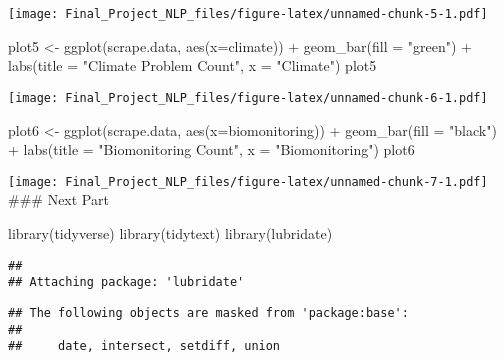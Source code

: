 \documentclass[
]{article}
\newenvironment{Shaded}{\begin{snugshade}}{\end{snugshade}}
\newcommand{\AttributeTok}[1]{\textcolor[rgb]{0.77,0.63,0.00}{#1}}
\newcommand{\FunctionTok}[1]{\textcolor[rgb]{0.00,0.00,0.00}{#1}}
\newcommand{\NormalTok}[1]{#1}
\newcommand{\OtherTok}[1]{\textcolor[rgb]{0.56,0.35,0.01}{#1}}
\newcommand{\SpecialCharTok}[1]{\textcolor[rgb]{0.00,0.00,0.00}{#1}}
\newcommand{\StringTok}[1]{\textcolor[rgb]{0.31,0.60,0.02}{#1}}
\begin{document}
\texttt{[image: Final\_Project\_NLP\_files/figure-latex/unnamed-chunk-5-1.pdf]}

\begin{Shaded}
\begin{Highlighting}[]
\NormalTok{plot5 }\OtherTok{\textless{}{-}} \FunctionTok{ggplot}\NormalTok{(scrape.data, }\FunctionTok{aes}\NormalTok{(}\AttributeTok{x=}\NormalTok{climate)) }\SpecialCharTok{+} \FunctionTok{geom\_bar}\NormalTok{(}\AttributeTok{fill =} \StringTok{"green"}\NormalTok{) }\SpecialCharTok{+}
  \FunctionTok{labs}\NormalTok{(}\AttributeTok{title =} \StringTok{"Climate Problem Count"}\NormalTok{, }\AttributeTok{x =} \StringTok{"Climate"}\NormalTok{)}
\NormalTok{plot5}
\end{Highlighting}
\end{Shaded}

\texttt{[image: Final\_Project\_NLP\_files/figure-latex/unnamed-chunk-6-1.pdf]}

\begin{Shaded}
\begin{Highlighting}[]
\NormalTok{plot6 }\OtherTok{\textless{}{-}} \FunctionTok{ggplot}\NormalTok{(scrape.data, }\FunctionTok{aes}\NormalTok{(}\AttributeTok{x=}\NormalTok{biomonitoring)) }\SpecialCharTok{+} \FunctionTok{geom\_bar}\NormalTok{(}\AttributeTok{fill =} \StringTok{"black"}\NormalTok{) }\SpecialCharTok{+}
  \FunctionTok{labs}\NormalTok{(}\AttributeTok{title =} \StringTok{"Biomonitoring Count"}\NormalTok{, }\AttributeTok{x =} \StringTok{"Biomonitoring"}\NormalTok{)}
\NormalTok{plot6}
\end{Highlighting}
\end{Shaded}

\texttt{[image: Final\_Project\_NLP\_files/figure-latex/unnamed-chunk-7-1.pdf]}
\#\#\# Next Part

\begin{Shaded}
\begin{Highlighting}[]
\FunctionTok{library}\NormalTok{(tidyverse)}
\FunctionTok{library}\NormalTok{(tidytext)}
\FunctionTok{library}\NormalTok{(lubridate)}
\end{Highlighting}
\end{Shaded}

\begin{verbatim}
## 
## Attaching package: 'lubridate'
\end{verbatim}

\begin{verbatim}
## The following objects are masked from 'package:base':
## 
##     date, intersect, setdiff, union
\end{verbatim}
\end{document}
